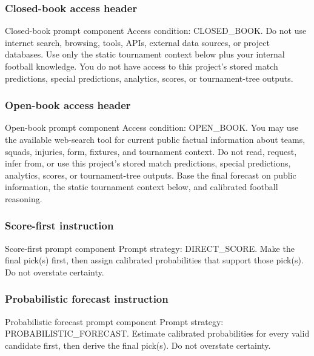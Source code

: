 \documentclass[sigconf,nonacm]{acmart}
\newcommand{\promptheadingbreak}{\leavevmode\par\nopagebreak[4]}
\begin{document}
\subsubsection*{Closed-book access header}
\promptheadingbreak
\begin{promptbox}{Closed-book prompt component}
Access condition: CLOSED_BOOK.
Do not use internet search, browsing, tools, APIs, external data sources, or project databases.
Use only the static tournament context below plus your internal football knowledge.
You do not have access to this project's stored match predictions, special predictions, analytics, scores, or tournament-tree outputs.
\end{promptbox}

\subsubsection*{Open-book access header}
\promptheadingbreak
\begin{promptbox}{Open-book prompt component}
Access condition: OPEN_BOOK.
You may use the available web-search tool for current public factual information about teams, squads, injuries, form, fixtures, and tournament context.
Do not read, request, infer from, or use this project's stored match predictions, special predictions, analytics, scores, or tournament-tree outputs.
Base the final forecast on public information, the static tournament context below, and calibrated football reasoning.
\end{promptbox}

\subsubsection*{Score-first instruction}
\promptheadingbreak
\begin{promptbox}{Score-first prompt component}
Prompt strategy: DIRECT_SCORE.
Make the final pick(s) first, then assign calibrated probabilities that support those pick(s).
Do not overstate certainty.
\end{promptbox}

\subsubsection*{Probabilistic forecast instruction}
\promptheadingbreak
\begin{promptbox}{Probabilistic forecast prompt component}
Prompt strategy: PROBABILISTIC_FORECAST.
Estimate calibrated probabilities for every valid candidate first, then derive the final pick(s).
Do not overstate certainty.
\end{promptbox}
\end{document}
